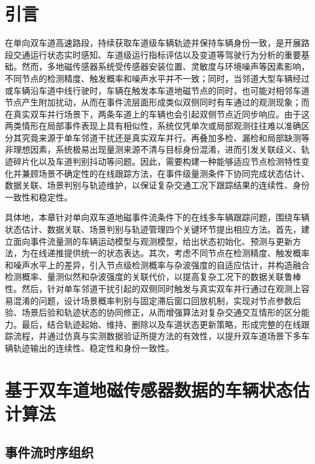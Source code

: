 \documentclass{xdupgthesis}
\begin{document}
\section{引言}

在单向双车道高速路段，持续获取车道级车辆轨迹并保持车辆身份一致，是开展路段交通运行状态实时感知、车道级运行指标评估以及变道等驾驶行为分析的重要基础。然而，多地磁传感器系统受传感器安装位置、灵敏度与环境噪声等因素影响，不同节点的检测精度、触发概率和噪声水平并不一致；同时，当邻道大型车辆经过或车辆沿车道中线行驶时，车辆在触发本车道地磁节点的同时，也可能对相邻车道节点产生附加扰动，从而在事件流层面形成类似双侧同时有车通过的观测现象；而在真实双车并行场景下，两条车道上的车辆也会引起双侧节点近同步响应。由于这两类情形在局部事件表现上具有相似性，系统仅凭单次或局部观测往往难以准确区分其究竟来源于单车邻道干扰还是真实双车并行。再叠加多检、漏检和局部缺测等非理想因素，系统极易出现量测来源不清与目标身份混淆，进而引发关联歧义、轨迹碎片化以及车道判别抖动等问题。因此，需要构建一种能够适应节点检测特性变化并兼顾场景不确定性的在线跟踪方法，在事件级量测条件下协同完成状态估计、数据关联、场景判别与轨迹维护，以保证复杂交通工况下跟踪结果的连续性、身份一致性和稳定性。

具体地，本章针对单向双车道地磁事件流条件下的在线多车辆跟踪问题，围绕车辆状态估计、数据关联、场景判别与轨迹管理四个关键环节提出相应方法。首先，建立面向事件流量测的车辆运动模型与观测模型，给出状态初始化、预测与更新方法，为在线递推提供统一的状态表达。其次，考虑不同节点在检测精度、触发概率和噪声水平上的差异，引入节点级检测概率与杂波强度的自适应估计，并构造融合检测概率、量测似然和杂波强度的关联代价，以提高复杂工况下的数据关联鲁棒性。然后，针对单车邻道干扰引起的双侧同时触发与真实双车并行通过在观测上容易混淆的问题，设计场景概率判别与固定滞后窗口回放机制，实现对节点参数后验、场景后验和轨迹状态的协同修正，从而增强算法对复杂交通交互情形的区分能力。最后，结合轨迹起始、维持、删除以及车道状态更新策略，形成完整的在线跟踪流程，并通过仿真与实测数据验证所提方法的有效性，以提升双车道场景下多车辆轨迹输出的连续性、稳定性和身份一致性。

\section{基于双车道地磁传感器数据的车辆状态估计算法}
\label{sec:ch3_state_estimation}



\subsection{事件流时序组织}
\end{document}
